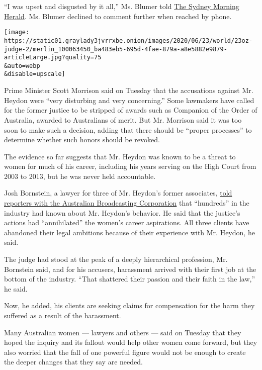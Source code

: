 ``I was upset and disgusted by it all,'' Ms. Blumer told
\href{https://www.smh.com.au/politics/federal/the-judge-s-hands-became-very-busy-under-the-table-lawyer-says-heydon-groped-her-20200622-p554zg.html}{The
Sydney Morning Herald}. Ms. Blumer declined to comment further when
reached by phone.

\texttt{[image: https://static01.graylady3jvrrxbe.onion/images/2020/06/23/world/23oz-judge-2/merlin\_100063450\_ba483eb5-695d-4fae-879a-a8e5882e9879-articleLarge.jpg?quality=75\\\&auto=webp\\\&disable=upscale]}

Prime Minister Scott Morrison said on Tuesday that the accusations
against Mr. Heydon were ``very disturbing and very concerning.'' Some
lawmakers have called for the former justice to be stripped of awards
such as Companion of the Order of Australia, awarded to Australians of
merit. But Mr. Morrison said it was too soon to make such a decision,
adding that there should be ``proper processes'' to determine whether
such honors should be revoked.

The evidence so far suggests that Mr. Heydon was known to be a threat to
women for much of his career, including his years serving on the High
Court from 2003 to 2013, but he was never held accountable.

Josh Bornstein, a lawyer for three of Mr. Heydon's former associates,
\href{https://www.abc.net.au/radio/melbourne/programs/mornings/dyson-heydon-shattered-associates-career-aspirations/12383230}{told
reporters with the Australian Broadcasting Corporation} that
``hundreds'' in the industry had known about Mr. Heydon's behavior. He
said that the justice's actions had ``annihilated'' the women's career
aspirations. All three clients have abandoned their legal ambitions
because of their experience with Mr. Heydon, he said.

The judge had stood at the peak of a deeply hierarchical profession, Mr.
Bornstein said, and for his accusers, harassment arrived with their
first job at the bottom of the industry. ``That shattered their passion
and their faith in the law,'' he said.

Now, he added, his clients are seeking claims for compensation for the
harm they suffered as a result of the harassment.

Many Australian women --- lawyers and others --- said on Tuesday that
they hoped the inquiry and its fallout would help other women come
forward, but they also worried that the fall of one powerful figure
would not be enough to create the deeper changes that they say are
needed.


